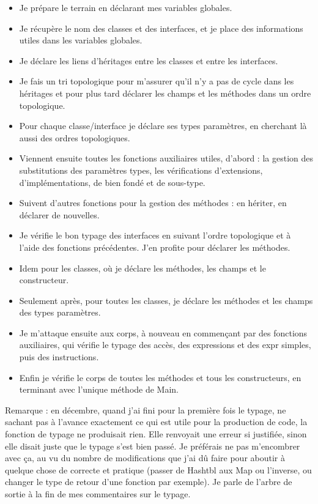 \documentclass[12pt,a4paper]{report}
\begin{document}
\begin{itemize}[label=\textbullet]
\item Je prépare le terrain en déclarant mes variables globales.
\item Je récupère le nom des classes et des interfaces, et je place des informations utiles dans les variables globales.
\item Je déclare les liens d'héritages entre les classes et entre les interfaces.
\item Je fais un tri topologique pour m'assurer qu'il n'y a pas de cycle dans les héritages et pour plus tard déclarer les champs et les méthodes dans un ordre topologique. 
\item Pour chaque classe/interface je déclare ses types paramètres, en cherchant là aussi des ordres topologiques.
\item Viennent ensuite toutes les fonctions auxiliaires utiles, d'abord : la gestion des substitutions des paramètres types, les vérifications d'extensions, d'implémentations, de bien fondé et de sous-type. 
\item Suivent d'autres fonctions pour la gestion des méthodes : en hériter, en déclarer de nouvelles. 
\item Je vérifie le bon typage des interfaces en suivant l'ordre topologique et à l'aide des fonctions précédentes. J'en profite pour déclarer les méthodes.
\item Idem pour les classes, où je déclare les méthodes, les champs et le constructeur.
\item Seulement après, pour toutes les classes, je déclare les méthodes et les champs des types paramètres.
\item Je m'attaque ensuite aux corps, à nouveau en commençant par des fonctions auxiliaires, qui vérifie le typage des accès, des expressions et des expr simples, puis des instructions.
\item Enfin je vérifie le corps de toutes les méthodes et tous les constructeurs, en terminant avec l'unique méthode de Main.
\end{itemize}
Remarque : en décembre, quand j'ai fini pour la première fois le typage, ne sachant pas à l'avance exactement ce qui est utile pour la production de code, la fonction de typage ne produisait rien. Elle renvoyait une erreur si justifiée, sinon elle disait juste que le typage s'est bien passé. Je préférais ne pas m'encombrer avec ça, au vu du nombre de modifications que j'ai dû faire pour aboutir à quelque chose de correcte et pratique (passer de Hashtbl aux Map ou l'inverse, ou changer le type de retour d'une fonction par exemple). Je parle de l'arbre de sortie à la fin de mes commentaires sur le typage. \\ 
\end{document}
